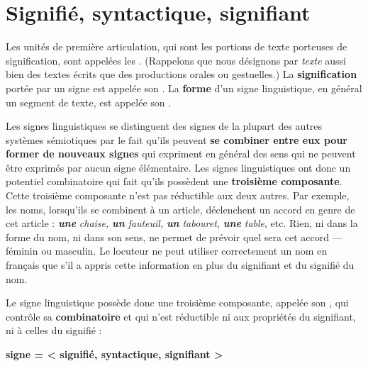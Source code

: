 \section{Signifié, syntactique, signifiant}\label{sec:2.1.3}

\begin{styleLivreImportant}
Les unités de première articulation, qui sont les portions de texte porteuses de signification, sont appelées les  . (Rappelons que nous désignons par \textit{texte} aussi bien des textes écrits que des productions orales ou gestuelles.) La \textbf{signification} portée par un signe est appelée son . La \textbf{forme} d’un signe linguistique, en général un segment de texte, est appelée son .
\end{styleLivreImportant}

Les signes linguistiques se distinguent des signes de la plupart des autres systèmes sémiotiques par le fait qu’ils peuvent \textbf{se combiner entre eux pour former de nouveaux signes} qui expriment en général des sens qui ne peuvent être exprimés par aucun signe élémentaire. Les signes linguistiques ont donc un potentiel combinatoire qui fait qu’ils possèdent une \textbf{troisième composante}. Cette troisième composante n’est pas réductible aux deux autres. Par exemple, les noms, lorsqu’ils se combinent à un article, déclenchent un accord en genre de cet article : \textbf{\textit{une}} \textit{chaise,} \textbf{\textit{un}} \textit{fauteuil,} \textbf{\textit{un}} \textit{tabouret,} \textbf{\textit{une}} \textit{table}, etc. Rien, ni dans la forme du nom, ni dans son sens, ne permet de prévoir quel sera cet accord — féminin ou masculin. Le locuteur ne peut utiliser correctement un nom en français que s’il a appris cette information en plus du signifiant et du signifié du nom.

\begin{styleLivreImportant}
Le signe linguistique possède donc une troisième composante, appelée son , qui contrôle sa \textbf{combinatoire} et qui n’est réductible ni aux propriétés du signifiant, ni à celles du signifié :
\end{styleLivreImportant}

\begin{styleLivreImportant}\bfseries
signe = < signifié, syntactique, signifiant >
\end{styleLivreImportant}


